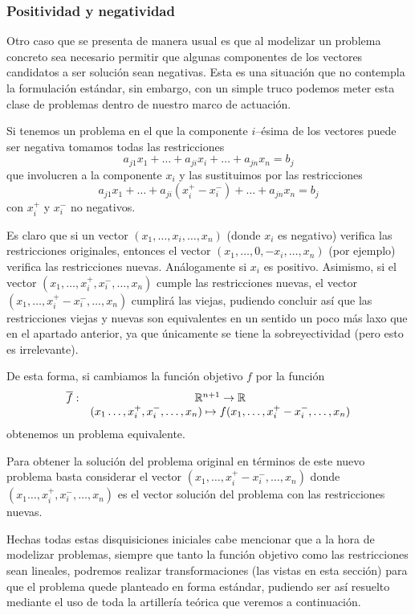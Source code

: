 \subsubsection{Positividad y negatividad}
Otro caso que se presenta de manera usual es que al modelizar un problema concreto sea necesario permitir que algunas componentes de los vectores candidatos a ser solución sean negativas. Esta es una situación que no contempla la formulación estándar, sin embargo, con un simple truco podemos meter esta clase de problemas dentro de nuestro marco de actuación.
\begin{obs}[Truco]
	Si tenemos un problema en el que la componente $i$--ésima de los vectores puede ser negativa tomamos todas las restricciones
	\begin{equation*}
	a_{j1}x_1+\dots+a_{ji}x_i+\dots+a_{jn}x_n=b_j
	\end{equation*}
	que involucren a la componente $x_i$ y las sustituimos por las restricciones
	\begin{equation*}
	a_{j1}x_1+\dots+a_{ji}(x_i^+-x_i^-)+\dots+a_{jn}x_n=b_j
	\end{equation*}
	con $x_i^+$ y $x_i^-$ no negativos.
	
	Es claro que si un vector $(x_1,\dots,x_i,\dots,x_n)$ (donde $x_i$ es negativo) verifica las restricciones originales, entonces el vector $(x_1,\dots,0,-x_i,\dots,x_n)$ (por ejemplo) verifica las restricciones nuevas. Análogamente si $x_i$ es positivo. Asimismo, si el vector $(x_1,\dots,x_i^+,x_i^-,\dots,x_n)$ cumple las restricciones nuevas, el vector $(x_1,\dots,x_i^+-x_i^-,\dots,x_n)$ cumplirá las viejas, pudiendo concluir así que las restricciones viejas y nuevas son equivalentes en un sentido un poco más laxo que en el apartado anterior, ya que únicamente se tiene la sobreyectividad (pero esto es irrelevante).
	
	De esta forma, si cambiamos la función objetivo $f$ por la función
	\begin{equation*}
		\begin{array}{cc}
		\overline{f}:&\mathbb{R}^{n+1}\to \mathbb{R}\\
		& (x_1\dots,x_i^+,x_i^-,\dots,x_n)\mapsto f(x_1,\dots,x_i^+-x_i^-,\dots,x_n)
		\end{array}
	\end{equation*}
	obtenemos un problema equivalente.
	
	Para obtener la solución del problema original en términos de este nuevo problema basta considerar el vector $(x_1,\dots,x_i^+-x_i^-,\dots,x_n)$ donde $(x_1\dots,x_i^+,x_i^-,\dots,x_n)$ es el vector solución del problema con las restricciones nuevas.
\end{obs}
Hechas todas estas disquisiciones iniciales cabe mencionar que a la hora de modelizar problemas, siempre que tanto la función objetivo como las restricciones sean lineales, podremos realizar transformaciones (las vistas en esta sección) para que el problema quede planteado en forma estándar, pudiendo ser así resuelto mediante el uso de toda la artillería teórica que veremos a continuación.

